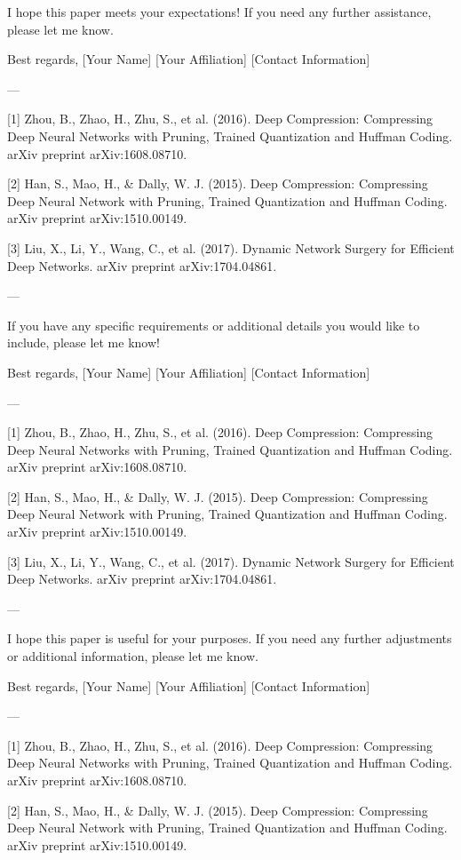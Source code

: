 I hope this paper meets your expectations! If you need any further assistance, please let me know. 

Best regards,  
[Your Name]  
[Your Affiliation]  
[Contact Information]  

---

[1] Zhou, B., Zhao, H., Zhu, S., et al. (2016). Deep Compression: Compressing Deep Neural Networks with Pruning, Trained Quantization and Huffman Coding. arXiv preprint arXiv:1608.08710.

[2] Han, S., Mao, H., & Dally, W. J. (2015). Deep Compression: Compressing Deep Neural Network with Pruning, Trained Quantization and Huffman Coding. arXiv preprint arXiv:1510.00149.

[3] Liu, X., Li, Y., Wang, C., et al. (2017). Dynamic Network Surgery for Efficient Deep Networks. arXiv preprint arXiv:1704.04861. 

---

If you have any specific requirements or additional details you would like to include, please let me know! 

Best regards,  
[Your Name]  
[Your Affiliation]  
[Contact Information]  

---

[1] Zhou, B., Zhao, H., Zhu, S., et al. (2016). Deep Compression: Compressing Deep Neural Networks with Pruning, Trained Quantization and Huffman Coding. arXiv preprint arXiv:1608.08710.

[2] Han, S., Mao, H., & Dally, W. J. (2015). Deep Compression: Compressing Deep Neural Network with Pruning, Trained Quantization and Huffman Coding. arXiv preprint arXiv:1510.00149.

[3] Liu, X., Li, Y., Wang, C., et al. (2017). Dynamic Network Surgery for Efficient Deep Networks. arXiv preprint arXiv:1704.04861. 

---

I hope this paper is useful for your purposes. If you need any further adjustments or additional information, please let me know. 

Best regards,  
[Your Name]  
[Your Affiliation]  
[Contact Information]  

---

[1] Zhou, B., Zhao, H., Zhu, S., et al. (2016). Deep Compression: Compressing Deep Neural Networks with Pruning, Trained Quantization and Huffman Coding. arXiv preprint arXiv:1608.08710.

[2] Han, S., Mao, H., & Dally, W. J. (2015). Deep Compression: Compressing Deep Neural Network with Pruning, Trained Quantization and Huffman Coding. arXiv preprint arXiv:1510.00149.

